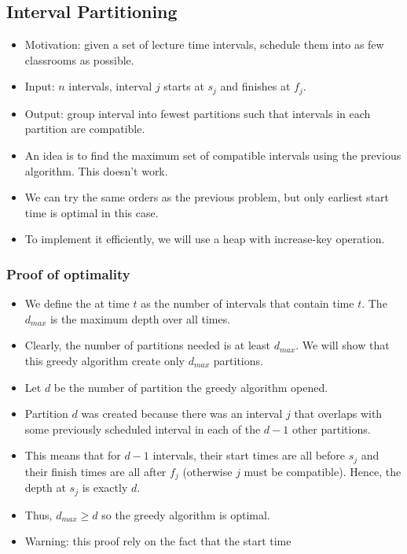 \documentclass[a4paper,12pt]{article}
\begin{document}
\subsection{Interval Partitioning}
\begin{itemize}
    \item Motivation: given a set of lecture time intervals, schedule them into as few classrooms as possible.
    \item Input: $n$ intervals, interval $j$ starts at $s_j$ and finishes at $f_j$.
    \item Output: group interval into fewest partitions such that intervals in each partition are compatible.
    \item An idea is to find the maximum set of compatible intervals using the previous algorithm. This doesn't work.
    \item We can try the same orders as the previous problem, but only earliest start time is optimal in this case.
    \item To implement it efficiently, we will use a heap with increase-key operation.
\end{itemize}
\subsubsection{Proof of optimality}
\begin{itemize}
    \item We define the  at time $t$ as the number of intervals that contain time $t$. The  $d_{max}$ is the maximum depth over all times.
    \item Clearly, the number of partitions needed is at least $d_{max}$. We will show that this greedy algorithm create only $d_{max}$ partitions.
    \item Let $d$ be the number of partition the greedy algorithm opened.
    \item Partition $d$ was created because there was an interval $j$ that overlaps with some previously scheduled interval in each of the $d-1$ other partitions.
    \item This means that for $d-1$ intervals, their start times are all before $s_j$ and their finish times are all after $f_j$ (otherwise $j$ must be compatible). Hence, the depth at $s_j$ is exactly $d$.
    \item Thus, $d_{max}\geq d$ so the greedy algorithm is optimal.
    \item Warning: this proof rely on the fact that the start time
\end{itemize}
\end{document}
